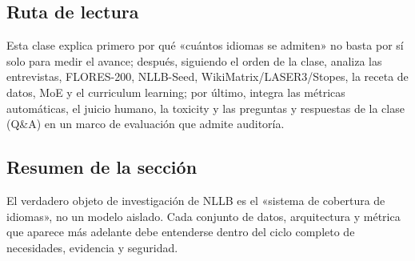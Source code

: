 \subsection{Ruta de lectura}

Esta clase explica primero por qué «cuántos idiomas se admiten» no basta por sí solo para medir el avance; después, siguiendo el orden de la clase, analiza las entrevistas, FLORES-200, NLLB-Seed, WikiMatrix/LASER3/Stopes, la receta de datos, MoE y el curriculum learning; por último, integra las métricas automáticas, el juicio humano, la toxicity y las preguntas y respuestas de la clase (Q\&A) en un marco de evaluación que admite auditoría.

\subsection{Resumen de la sección}

El verdadero objeto de investigación de NLLB es el «sistema de cobertura de idiomas», no un modelo aislado. Cada conjunto de datos, arquitectura y métrica que aparece más adelante debe entenderse dentro del ciclo completo de necesidades, evidencia y seguridad.
